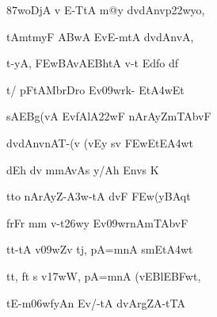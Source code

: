 {\dn \387woDjA v\4 E-TtA m@y\? d\?vdAnvp\322wyo, \vegdn\dontdisplaylinenum}

{\dn tAmtmyF{\qva} \3ABwA EvE-mtA d\?vdAnvA,{\dandabdn} \dontdisplaylinenum}

{\dn t-yA, \3FEwBAvAEBhtA v-t\? Edfo df \vegdn\dontdisplaylinenum}

{\dn t/ pFtAMbrDro Ev\309wr\?k- Et\3A4wEt{\dandabdn} \dontdisplaylinenum}

{\dn sAEBg(vA EvfAlA\322wF nArAyZmTAb\5vF \vegdn\dontdisplaylinenum}

{\dn d\?vdAnvnAT-(v\2 (vEy sv{\rdt} \3FEwEtE\3A4wt \dontdisplaylinenum}

{\dn d\?Eh d\?v mmAvAs\2 y/Ah\2 Envs\? K \vegdn\dontdisplaylinenum}

{\dn tto nArAyZ-\3A3w-tA\2 d\?vF{\qva} \3FEw(yBAqt{\dandabdn} \dontdisplaylinenum}

{\dn frFr\? mm v-t\326wy\2 Ev\309wr\?nAmTAb\5vF \vegdn\dontdisplaylinenum}

{\dn tt-tA\2 v\4\309wZv\2 t\?j, pA=mnA smEt\3A4wt{\dandabdn} \dontdisplaylinenum}

{\dn tt, f\?t\? s v\4\317wW, pA=mnA (vEBlE\3BFwt, \vegdn\dontdisplaylinenum}

{\dn tE-m\306wfyAn\? Ev/-tA d\?vArgZA-tTA{\dandabdn} \dontdisplaylinenum}

